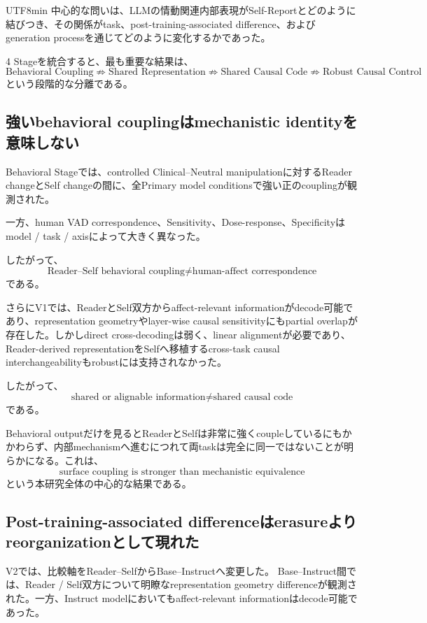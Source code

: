 \documentclass{article} %
\begin{document}
\begin{CJK*}{UTF8}{min}
中心的な問いは、LLMの情動関連内部表現がSelf-Reportとどのように結びつき、その関係がtask、post-training-associated difference、およびgeneration processを通じてどのように変化するかであった。

4 Stageを統合すると、最も重要な結果は、
\[
\text{Behavioral Coupling}
\not\Rightarrow
\text{Shared Representation}
\not\Rightarrow
\text{Shared Causal Code}
\not\Rightarrow
\text{Robust Causal Control}
\]
という段階的な分離である。


\subsection{強いbehavioral couplingはmechanistic identityを意味しない}

Behavioral Stageでは、controlled Clinical--Neutral manipulationに対するReader changeとSelf changeの間に、全Primary model conditionsで強い正のcouplingが観測された。

一方、human VAD correspondence、Sensitivity、Dose-response、Specificityはmodel / task / axisによって大きく異なった。

したがって、
\[
\text{Reader--Self behavioral coupling}
\neq
\text{human-affect correspondence}
\]
である。

さらにV1では、ReaderとSelf双方からaffect-relevant informationがdecode可能であり、representation geometryやlayer-wise causal sensitivityにもpartial overlapが存在した。しかしdirect cross-decodingは弱く、linear alignmentが必要であり、Reader-derived representationをSelfへ移植するcross-task causal interchangeabilityもrobustには支持されなかった。

したがって、
\[
\text{shared or alignable information}
\neq
\text{shared causal code}
\]
である。

Behavioral outputだけを見るとReaderとSelfは非常に強くcoupleしているにもかかわらず、内部mechanismへ進むにつれて両taskは完全に同一ではないことが明らかになる。これは、
\[
\text{surface coupling is stronger than mechanistic equivalence}
\]
という本研究全体の中心的な結果である。


\subsection{Post-training-associated differenceはerasureよりreorganizationとして現れた}

V2では、比較軸をReader--SelfからBase--Instructへ変更した。
Base--Instruct間では、Reader / Self双方について明瞭なrepresentation geometry differenceが観測された。一方、Instruct modelにおいてもaffect-relevant informationはdecode可能であった。


\end{CJK*}
\end{document}
